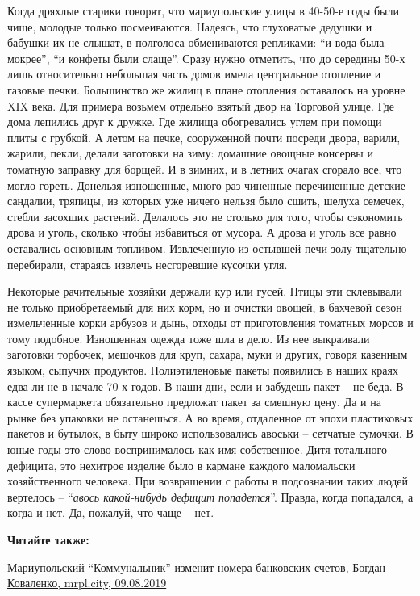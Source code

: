 Когда дряхлые старики говорят, что мариупольские улицы в 40-50-е годы были
чище, молодые только посмеиваются. Надеясь, что глуховатые дедушки и бабушки их
не слышат, в полголоса обмениваются репликами: \enquote{и вода была мокрее}, \enquote{и конфеты
были слаще}. Сразу нужно отметить, что до середины 50-х лишь относительно
небольшая часть домов имела центральное отопление и газовые печки. Большинство
же жилищ в плане отопления оставалось на уровне XIX века. Для примера возьмем
отдельно взятый двор на Торговой улице. Где дома лепились друг к дружке. Где
жилища обогревались углем при помощи плиты с грубкой. А летом на печке,
сооруженной почти посреди двора, варили, жарили, пекли, делали заготовки на
зиму: домашние овощные консервы и томатную заправку для борщей. И в зимних, и в
летних очагах сгорало все, что могло гореть. Донельзя изношенные, много раз
чиненные-перечиненные детские сандалии, тряпицы, из которых уже ничего нельзя
было сшить, шелуха семечек, стебли засохших растений. Делалось это не столько
для того, чтобы сэкономить дрова и уголь, сколько чтобы избавиться от мусора. А
дрова и уголь все равно оставались основным топливом. Извлеченную из остывшей
печи золу тщательно перебирали, стараясь извлечь несгоревшие кусочки угля.

Некоторые рачительные хозяйки держали кур или гусей. Птицы эти склевывали не
только приобретаемый для них корм, но и очистки овощей, в бахчевой сезон
измельченные корки арбузов и дынь, отходы от приготовления томатных морсов и
тому подобное. Изношенная одежда тоже шла в дело. Из нее выкраивали заготовки
торбочек, мешочков для круп, сахара, муки и других, говоря казенным языком,
сыпучих продуктов. Полиэтиленовые пакеты появились в наших краях едва ли не в
начале 70-х годов. В наши дни, если и забудешь пакет – не беда. В кассе
супермаркета обязательно предложат пакет за смешную цену. Да и на рынке без
упаковки не останешься. А во время, отдаленное от эпохи пластиковых пакетов и
бутылок, в быту широко использовались авоськи – сетчатые сумочки. В юные годы
это слово воспринималось как имя собственное. Дитя тотального дефицита, это
нехитрое изделие было в кармане каждого маломальски хозяйственного человека.
При возвращении с работы в подсознании таких людей вертелось – \enquote{\em авось
какой-нибудь дефицит попадется}. Правда, когда попадался, а когда и нет. Да,
пожалуй, что чаще – нет.

\textbf{Читайте также:} 

\href{https://mrpl.city/news/view/mariupolskij-kommunalnik-izmenit-nomera-bankovskih-schetov}{%
Мариупольский \enquote{Коммунальник} изменит номера банковских счетов, Богдан Коваленко, mrpl.city, 09.08.2019}

